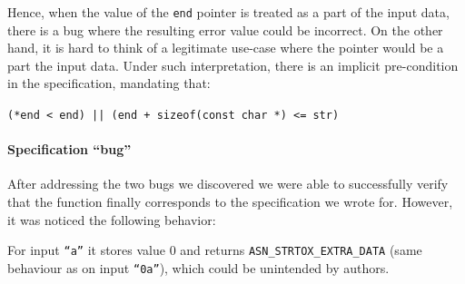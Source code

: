 \documentclass[acmsmall,nonacm]{acmart}
\begin{document}
     
     
     

     
     
     


    
    




   



    

Hence, when the value of the \texttt{end} pointer is treated as a part of the input data, there is a bug where the resulting error value could be incorrect. On the other hand, it is hard to think of a legitimate use-case where the pointer would be a part the input data. Under such interpretation, there is an implicit pre-condition in the specification, mandating that:

{\small
\texttt{(*end < end) || (end + sizeof(const char *) <= str)}}


\paragraph{Specification ``bug''}
After addressing the two bugs we discovered we were able to successfully verify that the function finally corresponds to the specification we wrote for. However, it was noticed the following behavior:

For input \texttt{``a''} it stores value 0 and returns {\color{green}\texttt{ASN\_STRTOX\_EXTRA\_DATA}} (same behaviour as on input \texttt{``0a''}), which could be unintended by authors. \\
\end{document}
